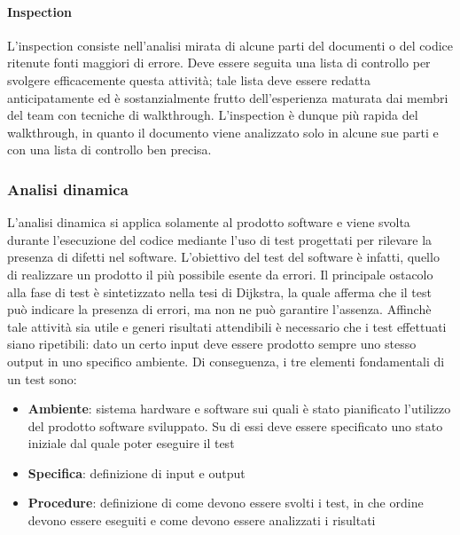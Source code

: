  \paragraph{Inspection} 
L’inspection consiste nell’analisi mirata di alcune parti del documenti o del codice ritenute fonti maggiori di errore. Deve essere seguita una lista di controllo per svolgere efficacemente questa attività; tale lista deve essere redatta anticipatamente ed è sostanzialmente frutto dell’esperienza maturata dai membri del team con tecniche di walkthrough. L’inspection è dunque più rapida del walkthrough, in quanto il documento viene analizzato solo in alcune sue parti e con una lista di controllo ben precisa.

\subsubsection{Analisi dinamica}

L’analisi dinamica si applica solamente al prodotto software e viene svolta durante l’esecuzione del codice mediante l’uso di test progettati per rilevare la presenza di difetti nel software. L’obiettivo del test del software è infatti, quello di realizzare un prodotto il più possibile esente da errori. Il principale ostacolo alla fase di test è sintetizzato nella tesi di Dijkstra, la quale afferma che il test può indicare la presenza di errori, ma non ne può garantire l’assenza.
Affinchè tale attività sia utile e generi risultati attendibili è necessario che i test effettuati siano ripetibili: dato un certo input deve essere prodotto sempre uno stesso output in uno specifico ambiente. Di conseguenza, i tre elementi fondamentali di un test sono:

\begin{itemize}
\item \textbf{Ambiente}: sistema hardware e software sui quali è stato pianificato l’utilizzo del prodotto software sviluppato. Su di essi deve essere specificato uno stato iniziale dal quale poter eseguire il test

\item \textbf{Specifica}: definizione di input e output
\item \textbf{Procedure}: definizione di come devono essere svolti i test, in che ordine devono essere eseguiti e come devono essere analizzati i risultati
\end{itemize}



